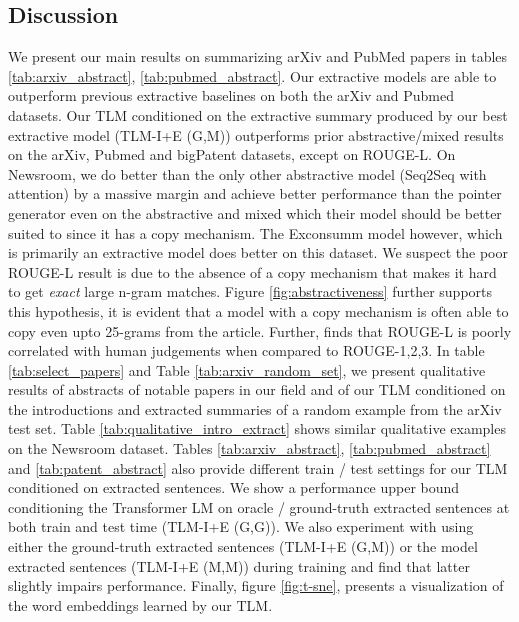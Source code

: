 \documentclass[letterpaper]{article} \usepackage{arXiv_V2_aaai_sty_mods}  \usepackage{times}  \usepackage{helvet} \usepackage{courier}  \usepackage[hyphens]{url}  \usepackage{graphicx} \usepackage[utf8]{inputenc} \usepackage[T1]{fontenc}    \usepackage{url}            \usepackage{booktabs}       \usepackage{amsfonts}       \usepackage{nicefrac}       \usepackage{multirow}
\begin{document}
\subsection{Discussion}
We present our main results on summarizing arXiv and PubMed papers in tables \ref{tab:arxiv_abstract}, \ref{tab:pubmed_abstract}. Our extractive models are able to outperform previous extractive baselines on both the arXiv and Pubmed datasets.
Our TLM conditioned on the extractive summary produced by our best extractive model (TLM-I+E (G,M)) outperforms prior abstractive/mixed results on the arXiv, Pubmed and bigPatent datasets, except on ROUGE-L. On Newsroom, we do better than the only other abstractive model (Seq2Seq with attention) by a massive margin and achieve better performance than the pointer generator even on the abstractive and mixed which their model should be better suited to since it has a copy mechanism. The Exconsumm model \cite{mendes2019jointly}  however, which is primarily an extractive model does better on this dataset. We suspect the poor ROUGE-L result is due to the absence of a copy mechanism that makes it hard to get \textit{exact} large n-gram matches. Figure \ref{fig:abstractiveness} further supports this hypothesis, it is evident that a model with a copy mechanism is often able to copy even upto 25-grams from the article. Further, \cite{graham2015re} finds that ROUGE-L is poorly correlated with human judgements when compared to ROUGE-1,2,3. In table \ref{tab:select_papers} and Table \ref{tab:arxiv_random_set}, we present qualitative results of abstracts of notable papers in our field and of our TLM conditioned on the introductions and extracted summaries of a random example from the arXiv test set. Table \ref{tab:qualitative_intro_extract} shows similar qualitative examples on the Newsroom dataset. Tables \ref{tab:arxiv_abstract}, \ref{tab:pubmed_abstract} and \ref{tab:patent_abstract} also provide different train / test settings for our TLM conditioned on extracted sentences. We show a performance upper bound conditioning the Transformer LM on oracle / ground-truth extracted sentences at both train and test time (TLM-I+E (G,G)). We also experiment with using either the ground-truth extracted sentences (TLM-I+E (G,M)) or the model extracted sentences (TLM-I+E (M,M)) during training and find that latter slightly impairs performance. Finally, figure \ref{fig:t-sne}, presents a visualization of the word embeddings learned by our TLM.
\end{document}

